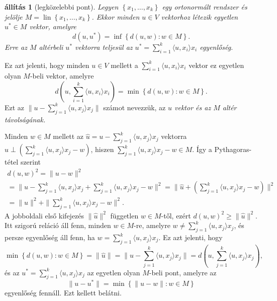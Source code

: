 \documentclass[a4paper, showtrims]{memoir}
\makeatletter
\renewenvironment{proof}[1][\proofname]
    {\par\pushQED{\qed}%
    \normalfont \topsep6\p@\@plus6\p@\relax
    \trivlist
    \item[\hskip\labelsep
        \itshape
    #1\@addpunct{:}]\ignorespaces}
    {\popQED\endtrivlist\@endpefalse}
\theoremstyle{plain}
\newtheorem{proposition}{állítás}[chapter]
\theoremstyle{remark}
\theoremstyle{definition}
\DeclareMathOperator{\lin}{lin}
\newcommand{\ip}[2]{\langle#1,#2\rangle}
\makeatother
\begin{document}
\begin{proposition}[legközelebbi pont]\label{pr:legkozelebb}
	Legyen $\left\{ x_1,\ldots,x_k \right\}$ egy ortonormált rendszer és
	jelölje $M=\lin\left\{ x_1,\ldots,x_k \right\}$.
	Ekkor minden $u\in V$ vektorhoz létezik egyetlen $u^\ast\in M$
	vektor, amelyre
	\[
		d\left( u,u^\ast\right)
		=
		\inf\left\{ d\left( u,w \right):w\in M \right\}.
	\]
	Erre az $M$ altérbeli $u^\ast$ vektorra teljesül az $u^\ast=\sum_{i=1}^k\ip{u}{x_i}x_i$ egyenlőség.
\end{proposition}
Ez azt jelenti,
hogy minden $u\in V$ mellett a
$\sum_{i=1}^k\ip{u}{x_i}x_i$
vektor ez egyetlen olyan $M$-beli vektor, amelyre
\[
	d\left( u,\sum_{i=1}^k\ip{u}{x_i}x_i \right)
	=
	\min\left\{ d\left( u,w \right):w\in M \right\}.
\]
Ezt az
\begin{math}
	\|u-\sum_{j=1}^k\ip{u}{x_j}x_j\|
\end{math}
számot nevezzük, az \emph{$u$ vektor és az $M$ altér távolságának.}
\begin{proof}
	Minden $w\in M$ mellett az $\hat{u}=u-\sum_{j=1}^k\ip{u}{x_j}x_j$ vektorra
	$\hat{u}\perp \left( \sum_{j=1}^k\ip{u}{x_j}x_j-w \right)$,
	hiszen $\sum_{j=1}^k\ip{u}{x_j}x_j-w\in M$.
	Így a Pythagoras-tétel szerint
	\begin{multline*}
		d\left( u,w \right)^2
		=
		\|u-w\|^2
		\\
		=
		\|u-\sum_{j=1}^k\ip{u}{x_j}x_j+\sum_{j=1}^k\ip{u}{x_j}x_j-w\|^2
		=
		\|\hat{u}+\left( \sum_{j=1}^k\ip{u}{x_j}x_j-w \right)\|^2
		\\
		=
		\|\hat{u}\|^2+\|\sum_{j=1}^k\ip{u}{x_j}x_j-w\|^2.
	\end{multline*}
	A jobboldali első kifejezés $\|\hat{u}\|^2$ független $w\in M$-től,
	ezért
	\begin{math}
		d\left( u,w \right)^2
		\geq
		\|\hat{u}\|^2.
	\end{math}
	Itt szigorú reláció áll fenn, minden $w\in M$-re, amelyre
	$w\neq\sum_{j=1}^k\ip{u}{x_j}x_j $,
	és persze egyenlőség áll fenn, ha
	$w=\sum_{j=1}^k\ip{u}{x_j}x_j $.
	Ez azt jelenti,
	hogy
	\[
		\min\left\{ d\left( u,w \right):w\in M \right\}
		=
		\|\hat{u}\|
		=
		\| u-\sum_{j=1}^k\ip{u}{x_j}x_j\|
		=
		d\left( u,\sum_{j=1}^k\ip{u}{x_j}x_j\right),
	\]
	és az $u^\ast=\sum_{j=1}^k\ip{u}{x_j}x_j $ az egyetlen olyan $M$-beli pont, amelyre
	az
	$$\|u-u^\ast\|=\min\left\{ \|u-w\|:w\in M  \right\}
    $$ egyenlőség fennáll.
	Ezt kellett belátni.
\end{proof}
\end{document}
